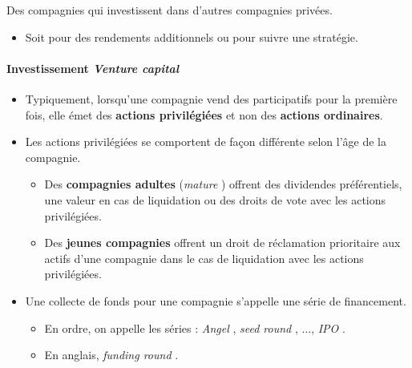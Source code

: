 \documentclass[10pt, french]{article}
\begin{document}
\begin{multicols*}{2}
\begin{definitionNOHFILLsub}
Des compagnies qui investissent dans d'autres compagnies privées.
\begin{itemize}
	\item	Soit pour des rendements additionnels ou pour suivre une stratégie.
\end{itemize}
\end{definitionNOHFILLsub}


\paragraph{Investissement \og \textit{Venture capital} \fg{}}
\begin{itemize}
	\item	Typiquement, lorsqu'une compagnie vend des participatifs pour la première fois, elle émet des \textbf{actions privilégiées} et non des \textbf{actions ordinaires}.
	\item	Les actions privilégiées se comportent de façon différente selon l'âge de la compagnie.
		\begin{itemize}
		\item	Des \textbf{compagnies adultes} (\og \textit{mature} \fg{}) offrent des dividendes préférentiels, une valeur en cas de liquidation ou des droits de vote avec les actions privilégiées.
		\item	Des \textbf{jeunes compagnies} offrent un droit de réclamation prioritaire aux actifs d'une compagnie dans le cas de liquidation avec les actions privilégiées.
		\end{itemize}		 
	\item	Une collecte de fonds pour une compagnie s'appelle une série de financement.
		\begin{itemize}
		\item	En ordre, on appelle les séries : \og \textit{Angel} \fg{}, \og \textit{seed round} \fg{}, $\dots$, \og \textit{IPO} \fg{}.
		\item	En anglais, \og \textit{funding round} \fg{}.
		\end{itemize}
\end{itemize}



\end{multicols*}
\end{document}
